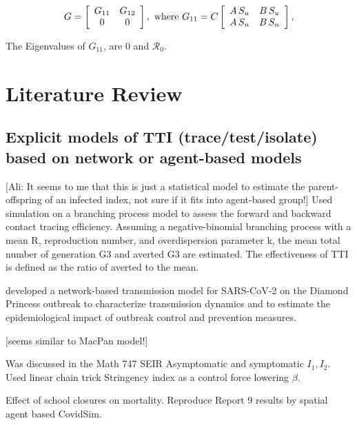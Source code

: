 \documentclass{article}
\newcommand{\Rnum}{\mathcal{R}_0}
\theoremstyle{definition} %
\begin{document}
\begin{equation}
G = \left[ \begin {array}{cc}
G_{11}&G_{12}\\
0&0
\end {array} \right], \text{ where } \\
G_{11} =C
\left[\begin {array}{cc}
A\,S_u & B\,S_u\\
A\,S_n & B\,S_n
\end {array}\right],
\end{equation}

The Eigenvalues of $G_{11}$, are 0 and $\Rnum$.

\section{Literature Review}

\subsection{Explicit models of TTI (trace/test/isolate) based on network or agent-based models}
\citep{endo2020implication} [Ali: It seems to me that this is just a statistical model to estimate the parent-offspring of an infected index, not sure if it fits into agent-based group!] Used simulation on a branching process model to assess the forward and backward contact tracing efficiency. Assuming a negative-binomial branching process with a mean R, reproduction number, and overdispersion parameter k, the mean total number of generation G3 and averted G3 are estimated. The effectiveness of TTI is defined as the ratio of averted to the mean.

\citep{jenness2020modeling} developed a network-based transmission model for SARS-CoV-2 on the Diamond Princess outbreak to characterize transmission dynamics and to estimate the epidemiological impact of outbreak control and prevention measures. 

\citep{elbanna2020entry} [seems similar to MacPan model!]

\citep{de2020influenza} Was discussed in the Math 747 
SEIR Asymptomatic and symptomatic $I_1, I_2$. Used linear chain trick 
Stringency index as a control force lowering $\beta$.

\citep{rice2020effect} Effect of school closures on mortality. Reproduce Report 9 results by spatial agent based CovidSim. 
\end{document}
